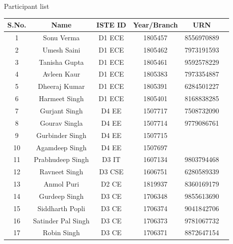 \documentclass[12pt, a4 paper]{article}
\begin{document}
\begin{center}
\huge Participant list
\end{center}

\begin{table}[h!]
  \begin{center}
    \begin{tabular}{|c|c|c|c|c|c|} 
    \toprule %
      \textbf{S.No.} & \textbf{Name} & \textbf{ISTE ID} &\textbf{Year/Branch} & \textbf{URN}\\
      \midrule %
      1  & Sonu Verma	      & D1 ECE & 1805457 & 8556970889 \\
      2  & Umesh Saini	      & D1 ECE & 1805462 & 7973191593 \\
      3  & Tanisha Gupta      & D1 ECE & 1805461 & 9592578229 \\
      4  & Avleen Kaur	      & D1 ECE & 1805383 & 7973354887 \\
      5  & Dheeraj Kumar	  & D1 ECE & 1805391 & 6284501227 \\
      6  & Harmeet Singh	  & D1 ECE & 1805401 & 8168838285 \\
      7  & Gurjant Singh	  & D4 EE  & 1507717 & 7508732090 \\
      8  & Gourav Singla	  & D4 EE  & 1507714 & 9779086761 \\
      9  & Gurbinder Singh	  & D4 EE  & 1507715	          \\
      10 & Agamdeep Singh	  & D4 EE  & 1507697	          \\
      11 & Prabhudeep Singh   & D3 IT  & 1607134 & 9803794468 \\
      12 & Ravneet Singh	  & D3 CSE & 1606751 & 6280589339 \\
      13 & Anmol Puri	      & D2 CE  & 1819937 & 8360169179 \\
      14 & Gurdeep Singh	  & D3 CE  & 1706348 & 9855613690 \\
      15 & Siddharth Popli	  & D3 CE  & 1706374 & 9041842706 \\
      16 & Satinder Pal Singh & D3 CE  & 1706373 & 9781067732 \\
      17 & Robin Singh	      & D3 CE  & 1706371 & 8872647154 \\

      \bottomrule %
    \end{tabular}
  \end{center}
\end{table}
\end{document}

